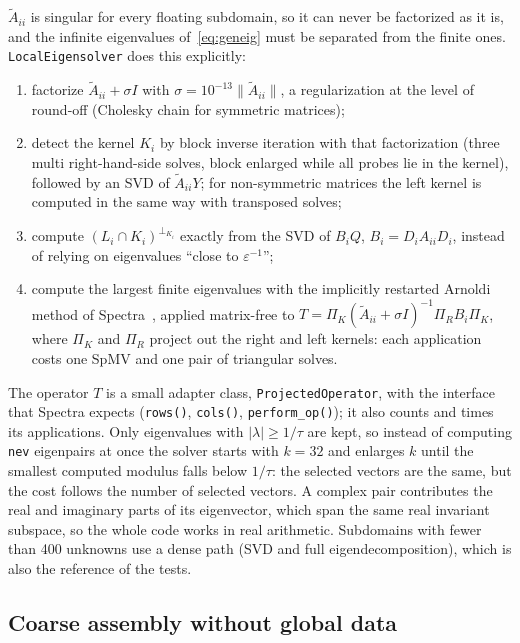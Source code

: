 \documentclass[11pt,a4paper]{article}
\newcommand{\At}{\widetilde{A}}
\begin{document}
$\At_{ii}$ is singular for every floating subdomain, so it can never be factorized as it is, and the
infinite eigenvalues of~\eqref{eq:geneig} must be separated from the finite ones. \texttt{LocalEigensolver}
does this explicitly:
\begin{enumerate}
\item factorize $\At_{ii}+\sigma I$ with $\sigma=10^{-13}\|\At_{ii}\|$, a regularization at the level of
  round-off (Cholesky chain for symmetric matrices);
\item detect the kernel $K_i$ by block inverse iteration with that factorization (three multi right-hand-side
  solves, block enlarged while all probes lie in the kernel), followed by an SVD of $\At_{ii}Y$; for
  non-symmetric matrices the left kernel is computed in the same way with transposed solves;
\item compute $(L_i\cap K_i)^{\perp_{K_i}}$ exactly from the SVD of $B_iQ$, $B_i=D_iA_{ii}D_i$, instead of
  relying on eigenvalues ``close to $\varepsilon^{-1}$'';
\item compute the largest finite eigenvalues with the implicitly restarted Arnoldi method of
  Spectra~\cite{Spectra}, applied matrix-free to $T=\Pi_K(\At_{ii}+\sigma I)^{-1}\Pi_R B_i\Pi_K$, where
  $\Pi_K$ and $\Pi_R$ project out the right and left kernels: each application costs one SpMV and one pair of
  triangular solves.
\end{enumerate}
The operator $T$ is a small adapter class, \texttt{ProjectedOperator}, with the interface that Spectra
expects (\texttt{rows()}, \texttt{cols()}, \texttt{perform\_op()}); it also counts and times its
applications. Only eigenvalues with $|\lambda|\geq1/\tau$ are kept, so instead of computing \texttt{nev}
eigenpairs at once the solver starts with $k=32$ and enlarges $k$ until the smallest computed modulus falls
below $1/\tau$: the selected vectors are the same, but the cost follows the number of selected vectors. A
complex pair contributes the real and imaginary parts of its eigenvector, which span the same real invariant
subspace, so the whole code works in real arithmetic. Subdomains with fewer than 400 unknowns use a dense
path (SVD and full eigendecomposition), which is also the reference of the tests.

\subsection{Coarse assembly without global data}\label{sec:coarseassembly}
\end{document}
